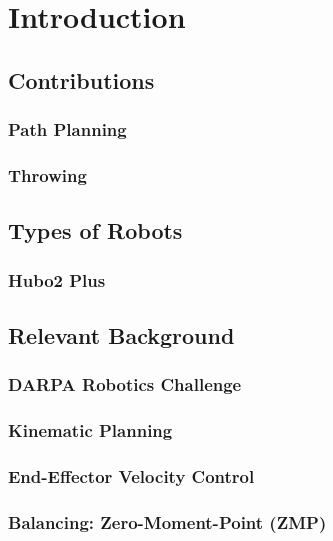 \section{Introduction}
	
	\subsection{Contributions}
		
		\subsubsection{Path Planning}\label{sec:srm}
		
		

		\subsubsection{Throwing}\label{sec:baseball}
		
		
		
	\subsection{Types of Robots}
		
		\subsubsection{Hubo2 Plus}\label{sec:hubo}
			
	\subsection{Relevant Background}
    		
    	\subsubsection{DARPA Robotics Challenge}
    	    
		\subsubsection{Kinematic Planning}
			
		\subsubsection{End-Effector Velocity Control}
			
%			
		\subsubsection{Balancing: Zero-Moment-Point (ZMP)}
			
